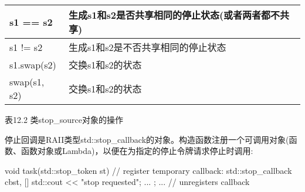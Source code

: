 \begin{longtable}[c]{|l|l|}
s1 == s2                      & 生成s1和s2是否共享相同的停止状态(或者两者都不共享)             \\ \hline
s1 != s2                      & 生成s1和s2是不否共享相同的停止状态                           \\ \hline
s1.swap(s2)                   & 交换s1和s2的状态                                                       \\ \hline
swap(s1, s2)                  & 交换s1和s2的状态                                                       \\ \hline
\end{longtable}

\begin{center}
表12.2 类stop\_source对象的操作
\end{center}


停止回调是RAII类型std::stop\_callback的对象。构造函数注册一个可调用对象(函数、函数对象或Lambda)，以便在为指定的停止令牌请求停止时调用:

\begin{cpp}
void task(std::stop_token st)
{
	// register temporary callback:
	std::stop_callback cb{st, []{
			std::cout << "stop requested\n";
			...
	}};
	...
} // unregisters callback
\end{cpp}

